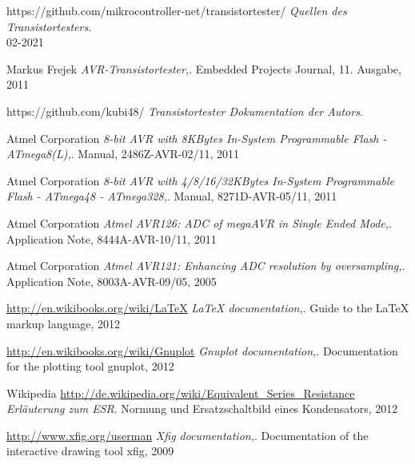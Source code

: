 \documentclass[pdftex,12pt,a4paper,oneside,english]{report}
\begin{document}












 
 
 
 
 
 






\begin{thebibliography}{99}

https://github.com/mikrocontroller-net/transistortester/
\emph{Quellen des Transistortesters}. 
\\ 02-2021

Markus Frejek
\emph{AVR-Transistortester,}.
Embedded Projects Journal,
11. Ausgabe,
2011

https://github.com/kubi48/
\emph{Transistortester Dokumentation der Autors}.

Atmel Corporation
\emph{8-bit AVR with 8KBytes In-System Programmable Flash - ATmega8(L),}.
Manual,
2486Z-AVR-02/11,
2011

Atmel Corporation
\emph{8-bit AVR with 4/8/16/32KBytes In-System Programmable Flash - ATmega48 - ATmega328,}.
Manual,
8271D-AVR-05/11,
2011

Atmel Corporation
\emph{Atmel AVR126: ADC of megaAVR in Single Ended Mode,}.
Application Note,
8444A-AVR-10/11,
2011

Atmel Corporation
\emph{Atmel AVR121: Enhancing ADC resolution by oversampling,}.
Application Note,
8003A-AVR-09/05,
2005

\url{http://en.wikibooks.org/wiki/LaTeX}
\emph{LaTeX documentation,}.
Guide to the LaTeX markup language,
2012

\url{http://en.wikibooks.org/wiki/Gnuplot}
\emph{Gnuplot documentation,}.
Documentation for the plotting tool gnuplot,
2012

Wikipedia
\url{http://de.wikipedia.org/wiki/Equivalent_Series_Resistance}
\emph{Erläuterung zum ESR}.
Normung und Ersatzschaltbild eines Kondensators,
2012

\url{http://www.xfig.org/userman}
\emph{Xfig documentation,}.
Documentation of the interactive drawing tool xfig,
2009


\end{thebibliography}
\end{document}
